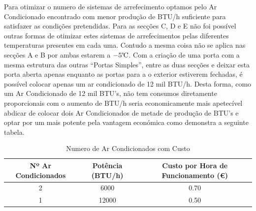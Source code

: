 \documentclass[12pt, a4paper]{article}
\begin{document}
\vspace{25mm}

Para otimizar o numero de sistemas de arrefecimento optamos pelo Ar Condicionado encontrado com menor produção de BTU/h suficiente para satisfazer as condições pretendidas. Para as secções C, D e E não foi possível outras formas de otimizar estes sistemas de arrefecimentos pelas diferentes temperaturas presentes em cada uma. Contudo a mesma coisa não se aplica nas secções A e B por ambas estarem a $-5{\celsius}$. Com a criação de uma porta com a mesma estrutura das outras ``Portas Simples'', entre as duas secções e deixar esta porta aberta apenas enquanto as portas para a o exterior estiverem fechadas, é possível colocar apenas um ar condicionado de 12 mil BTU/h. Desta forma, como um Ar Condicionado de 12 mil BTU's, não tem consumos diretamente proporcionais com o aumento de BTU/h seria economicamente mais apetecível abdicar de colocar dois Ar Condicionados de metade de produção de BTU's e optar por um mais potente pela vantagem económica como demonstra a seguinte tabela.


\vspace{25mm}

\begin{table}[htpb]
	\begin{center}
		\begin{tabular}{c c c}
			\toprule
			Nº Ar Condicionados 								 & 	Potência (BTU/h) 	 & 		Custo por Hora de Funcionamento (€)		 \\
			\midrule
			2				               	   								 & 6000 		 & 			0.70	    \\
			1					              							 	 & 12000 	 &				0.50		\\
			\bottomrule
		\end{tabular}
	\end{center}
	\caption{Numero de Ar Condicionados com Custo}\label{tab:compensa}
\end{table}


\pagebreak
\printbibliography{}
\end{document}
